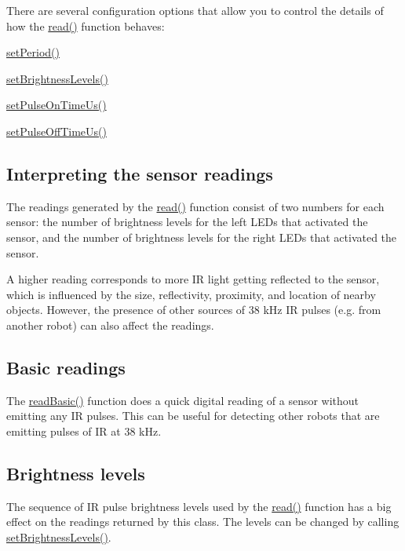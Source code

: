 There are several configuration options that allow you to control the details of how the \hyperlink{class_zumo32_u4_proximity_sensors_a071d935e10e2a16a3ae2559d16a12683}{read()} function behaves\+:


\begin{DoxyItemize}
\item \hyperlink{class_zumo32_u4_proximity_sensors_ab288aeae9bcc5933cede8941b709b4fc}{set\+Period()}
\item \hyperlink{class_zumo32_u4_proximity_sensors_a47820baf67dfa58dedb41cb7bb26dc65}{set\+Brightness\+Levels()}
\item \hyperlink{class_zumo32_u4_proximity_sensors_aeb626f226420976e774d93dd2a83e768}{set\+Pulse\+On\+Time\+Us()}
\item \hyperlink{class_zumo32_u4_proximity_sensors_a4d7911aca58734a76be212de103a1387}{set\+Pulse\+Off\+Time\+Us()}
\end{DoxyItemize}\hypertarget{class_zumo32_u4_proximity_sensors_autotoc_md14}{}\subsection{Interpreting the sensor readings}\label{class_zumo32_u4_proximity_sensors_autotoc_md14}
The readings generated by the \hyperlink{class_zumo32_u4_proximity_sensors_a071d935e10e2a16a3ae2559d16a12683}{read()} function consist of two numbers for each sensor\+: the number of brightness levels for the left L\+E\+Ds that activated the sensor, and the number of brightness levels for the right L\+E\+Ds that activated the sensor.

A higher reading corresponds to more IR light getting reflected to the sensor, which is influenced by the size, reflectivity, proximity, and location of nearby objects. However, the presence of other sources of 38 k\+Hz IR pulses (e.\+g. from another robot) can also affect the readings.\hypertarget{class_zumo32_u4_proximity_sensors_autotoc_md15}{}\subsection{Basic readings}\label{class_zumo32_u4_proximity_sensors_autotoc_md15}
The \hyperlink{class_zumo32_u4_proximity_sensors_a5c254dc2adf7c47203384241582349d3}{read\+Basic()} function does a quick digital reading of a sensor without emitting any IR pulses. This can be useful for detecting other robots that are emitting pulses of IR at 38 k\+Hz.\hypertarget{class_zumo32_u4_proximity_sensors_autotoc_md16}{}\subsection{Brightness levels}\label{class_zumo32_u4_proximity_sensors_autotoc_md16}
The sequence of IR pulse brightness levels used by the \hyperlink{class_zumo32_u4_proximity_sensors_a071d935e10e2a16a3ae2559d16a12683}{read()} function has a big effect on the readings returned by this class. The levels can be changed by calling \hyperlink{class_zumo32_u4_proximity_sensors_a47820baf67dfa58dedb41cb7bb26dc65}{set\+Brightness\+Levels()}.

